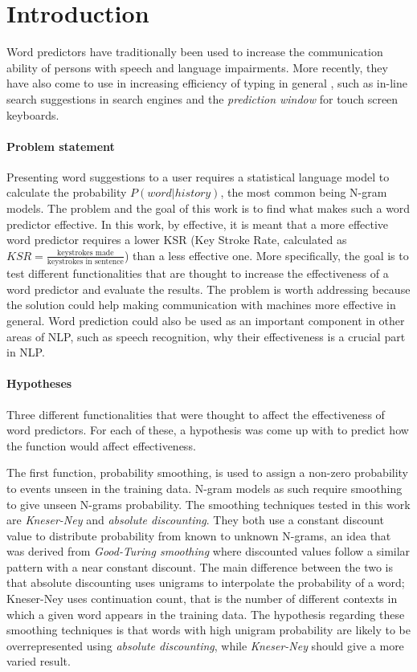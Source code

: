 \section{Introduction}
Word predictors have traditionally been used to increase the communication ability of persons with speech and language impairments\cite{Lesher99effectsof}\cite{keystrokes}\cite{corpus}. More recently, they have also come to use in increasing efficiency of typing in general \cite{Lesher99effectsof}, such as in-line search suggestions in search engines and the \emph{prediction window} for touch screen keyboards. 

\paragraph{Problem statement}
Presenting word suggestions to a user requires a statistical language model\cite{keystrokes} to calculate the probability $P(word|history)$, the most common being N-gram models\cite{Wandmacher}. The problem and the goal of this work is to find what makes such a word predictor effective. In this work, by effective, it is meant that a more effective word predictor requires a lower KSR (Key Stroke Rate, calculated as $KSR = \frac{\text{keystrokes made}}{\text{keystrokes in sentence}}$) than a less effective one. More specifically, the goal is to test different functionalities that are thought to increase the effectiveness of a word predictor and evaluate the results. The problem is worth addressing because the solution could help making communication with machines more effective in general. Word prediction could also be used as an important component in other areas of NLP, such as speech recognition, why their effectiveness is a crucial part in NLP.

\paragraph{Hypotheses}
Three different functionalities that were thought to affect the effectiveness of word predictors. For each of these, a hypothesis was come up with to predict how the function would affect effectiveness.

The first function, probability smoothing, is used to assign a non-zero probability to events unseen in the training data\cite{smoothing}. N-gram models as such require smoothing to give unseen N-grams probability\cite{Russel}. The smoothing techniques tested in this work are \emph{Kneser-Ney} and \emph{absolute discounting}. They both use a constant discount value to distribute probability from known to unknown N-grams, an idea that was derived from \emph{Good-Turing smoothing} where discounted values follow a similar pattern with a near constant discount\cite{coursera}. The main difference between the two is that absolute discounting uses unigrams to interpolate the probability of a word; Kneser-Ney uses continuation count, that is the number of different contexts in which a given word appears in the training data\cite{coursera}. The hypothesis regarding these smoothing techniques is that words with high unigram probability are likely to be overrepresented using \emph{absolute discounting}, while \emph{Kneser-Ney} should give a more varied result.

